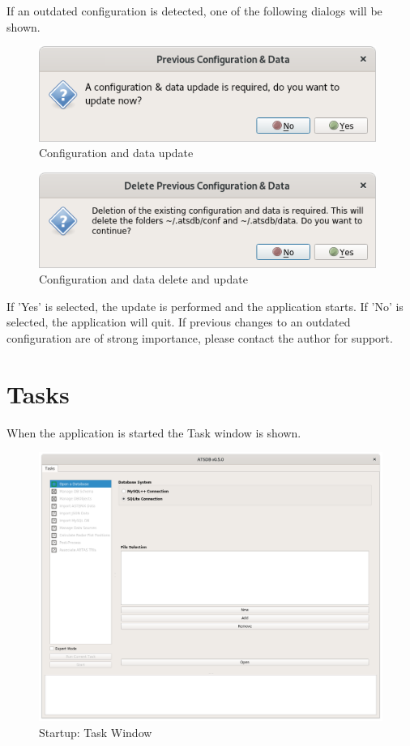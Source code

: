 If an outdated configuration is detected, one of the following dialogs will be shown.

\begin{figure}[H]
    \includegraphics[width=11cm]{../screenshots/config_data_update.png}
  \caption{Configuration and data update}
\end{figure}

\begin{figure}[H]
    \includegraphics[width=11cm]{../screenshots/config_data_delete_update.png}
  \caption{Configuration and data delete and update}
\end{figure}

If 'Yes' is selected, the update is performed and the application starts. If 'No' is selected, the application will quit. If previous changes to an outdated configuration are of strong importance, please contact the author for support. 

\section{Tasks}

When the application is started the Task window is shown. 

\begin{figure}[H]
  \hspace*{-2.5cm}
    \includegraphics[width=19cm]{../screenshots/task_open_database.png}
  \caption{Startup: Task Window}
\end{figure}

